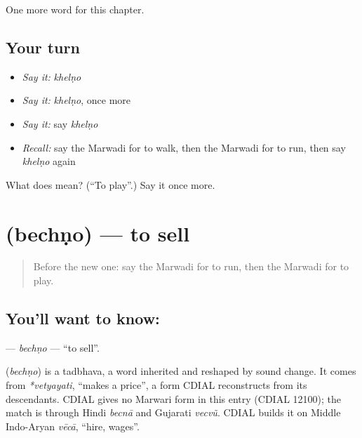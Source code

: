 \begin{grammarlens}[title={What you've built}]
One more word for this chapter.
\end{grammarlens}

\subsection*{Your turn}
\begin{itemize}
\raggedright
  \item \emph{Say it:} \emph{khelṇo}
  \item \emph{Say it:} \emph{khelṇo}, once more
  \item \emph{Say it:} say \emph{khelṇo}
  \item \emph{Recall:} say the Marwadi for to walk, then the Marwadi for to run, then say \emph{khelṇo} again
\end{itemize}

\begin{tcolorbox}[breakable,colback=teal!4,colframe=teal!35!black,title={Before you move on}]
What does  mean? (\textquotedblleft{}To play\textquotedblright{}.) Say it once more.
\end{tcolorbox}
\section[\texorpdfstring{\mw{बेचणो} (bechṇo)}{बेचणो (bechṇo)}]{ (bechṇo) — to sell}

\label{lesson:MW-C53-bechno}



\begin{quote}
Before the new one: say the Marwadi for to run, then the Marwadi for to play.
\end{quote}

\subsection*{You'll want to know: }
\textbf{} — \emph{bechṇo} — \textquotedblleft{}to sell\textquotedblright{}.

\begin{cousinweb}
\textbf{} (\emph{bechṇo}) is a tadbhava, a word inherited and reshaped by sound change. It comes from \emph{*vetyayati}, \textquotedblleft{}makes a price\textquotedblright{}, a form CDIAL reconstructs from its descendants. CDIAL gives no Marwari form in this entry (CDIAL 12100); the match is through Hindi \emph{becnā} and Gujarati \emph{vecvũ}. CDIAL builds it on Middle Indo-Aryan \emph{vēcā}, \textquotedblleft{}hire, wages\textquotedblright{}.
\end{cousinweb}

